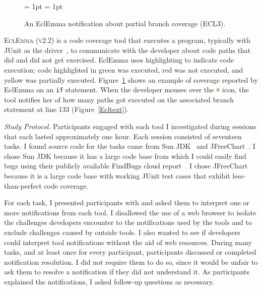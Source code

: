 \documentclass{llncs}
\begin{document}
\begin{figure} [h]
	\subfigcapskip = 1pt
	\centering
			\subfigcapskip = 1pt
				
				\caption{An EclEmma notification about partial branch coverage (ECL3).}
				\label{fig:notificationECL}
			\end{figure} 

\textsc{EclEmma (v2.2)} is a code coverage tool that executes a program, typically with JUnit
as the driver~\cite{JUnit}, to communicate with the developer about code paths that did and
did not get exercised. EclEmma uses highlighting to indicate code execution; code highlighted in
green was executed, red was not executed, and yellow was partially executed.
Figure~\ref{fig:notificationECL} shows an example of coverage reported by
EclEmma on an \texttt{if} statement. When the developer mouses over the
\includegraphics[height=9px]{figs/diamond} icon, the tool notifies her of how many
paths got executed on the associated branch statement at line 133
(Figure~\ref{Ecltext}).

\vspace{0.5em}
\noindent\textit{Study Protocol.} 
Participants engaged with each tool I investigated during sessions that each lasted approximately one hour. Each session consisted of seventeen tasks.
I found source code for the tasks came from Sun JDK~\cite{SunJDK} and JFreeChart~\cite{JFreeChart}. I chose Sun JDK because it has a large code base from which I could easily find bugs using their publicly available FindBugs cloud report~\cite{FindBugsCloud}. I chose JFreeChart because it is a large code base with working JUnit test cases that exhibit less-than-perfect code coverage.

For each task, I presented participants with and asked them to interpret one or more notifications from each tool.
I disallowed the use of a web browser to isolate the challenges developers encounter to the notifications used by the tools and to exclude challenges caused by outside tools.
I also wanted to see if developers could interpret tool notifications without the aid of web resources. During many tasks, and at least once for every participant, participants
discussed or completed notification resolution. I did not require them to do so, since it would be unfair to ask them to resolve a notification if they did not understand it.
As participants explained the notifications, I asked follow-up questions as necessary. 
\end{document}
